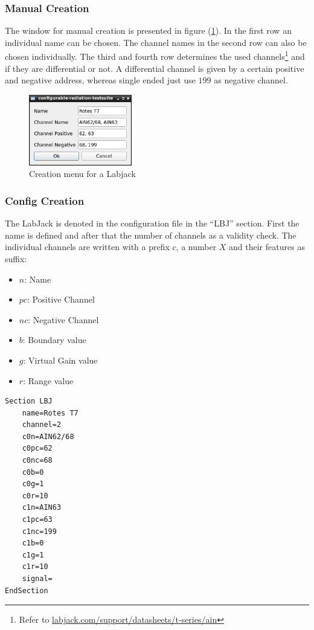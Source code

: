 \documentclass[10pt,a4paper]{article}
\begin{document}
	\subsubsection{Manual Creation}	
	
	The window for manual creation is presented in figure (\ref{f:lbj_menu}). In the first row an individual name can be chosen. The channel names in the second row can also be chosen individually. The third and fourth row determines the used channels\footnote{Refer to \url{labjack.com/support/datasheets/t-series/ain}} and if they are differential or not. A differential channel is given by a certain positive and negative address, whereas single ended just use $199$ as negative channel.
	
	
	\begin{figure}[H]
	\centering
	\includegraphics[width=0.4\textwidth]{./3_LBJ_menu.png}
	\caption{Creation menu for a Labjack}
	\label{f:lbj_menu}
	\end{figure}
	
	\subsubsection{Config Creation}	
	The LabJack is denoted in the configuration file in the \enquote{LBJ} section. First the name is defined and after that the number of channels as a validity check. The individual channels are written with a prefix $c$, a number $X$ and their features as suffix:
	
	\begin{itemize}
	\item $n$: Name
	\item $pc$: Positive Channel
	\item $nc$: Negative Channel
	\item $b$: Boundary value
	\item $g$: Virtual Gain value
	\item $r$: Range value
	\end{itemize}
	
\begin{lstlisting}[caption=LBJ Config]
Section LBJ
	name=Rotes T7
	channel=2
	c0n=AIN62/68
	c0pc=62
	c0nc=68
	c0b=0
	c0g=1
	c0r=10
	c1n=AIN63
	c1pc=63
	c1nc=199
	c1b=0
	c1g=1
	c1r=10
	signal=
EndSection
\end{lstlisting}
	
\end{document}
